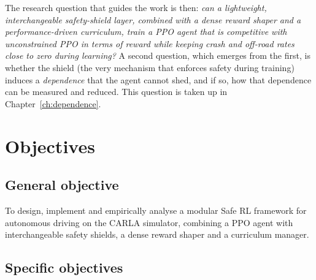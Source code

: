 The research question that guides the work is then: \emph{can a lightweight, interchangeable
safety-shield layer, combined with a dense reward shaper and a performance-driven curriculum,
train a PPO agent that is competitive with unconstrained PPO in terms of reward while keeping
crash and off-road rates close to zero during learning?} A second question, which emerges from the
first, is whether the shield (the very mechanism that enforces safety during training) induces
a \emph{dependence} that the agent cannot shed, and if so, how that dependence can be measured and
reduced. This question is taken up in Chapter~\ref{ch:dependence}.

\section{Objectives}\label{sec:intro-objectives}

\subsection*{General objective}

To design, implement and empirically analyse a modular Safe RL framework for autonomous driving
on the CARLA simulator, combining a PPO agent with interchangeable safety shields, a dense
reward shaper and a curriculum manager.

\subsection*{Specific objectives}

